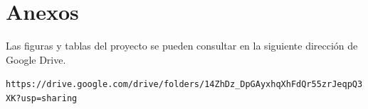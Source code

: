 \clearpage
\section{Anexos}\label{sec:anexos}
Las figuras y tablas del proyecto se pueden consultar en la siguiente dirección de Google Drive.
\par\noindent\nolinkurl{https://drive.google.com/drive/folders/14ZhDz_DpGAyxhqXhFdQr55zrJeqpQ3XK?usp=sharing}

\clearpage
{}\label{sec:referencias}
\renewcommand{\refname}{\thesection\quad Referencias}
